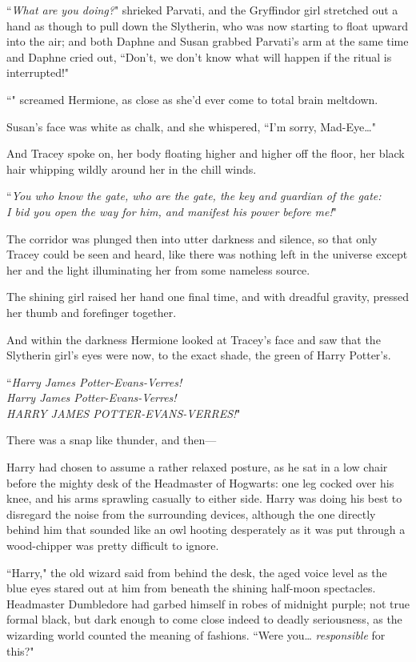 ``\emph{What are you doing?}" shrieked Parvati, and the Gryffindor girl stretched out a hand as though to pull down the Slytherin, who was now starting to float upward into the air; and both Daphne and Susan grabbed Parvati's arm at the same time and Daphne cried out, ``Don't, we don't know what will happen if the ritual is interrupted!"

``" screamed Hermione, as close as she'd ever come to total brain meltdown.

Susan's face was white as chalk, and she whispered, ``I'm sorry, Mad-Eye{\ldots}"

And Tracey spoke on, her body floating higher and higher off the floor, her black hair whipping wildly around her in the chill winds.

``\emph{You who know the gate, who are the gate, the key and guardian of the gate:\\
I bid you open the way for him, and manifest his power before me!}"

The corridor was plunged then into utter darkness and silence, so that only Tracey could be seen and heard, like there was nothing left in the universe except her and the light illuminating her from some nameless source.

The shining girl raised her hand one final time, and with dreadful gravity, pressed her thumb and forefinger together.

And within the darkness Hermione looked at Tracey's face and saw that the Slytherin girl's eyes were now, to the exact shade, the green of Harry Potter's.

``\emph{Harry James Potter-Evans-Verres!\\
Harry James Potter-Evans-Verres!\\
HARRY JAMES POTTER-EVANS-VERRES!}"

There was a snap like thunder, and then—

\later

Harry had chosen to assume a rather relaxed posture, as he sat in a low chair before the mighty desk of the Headmaster of Hogwarts: one leg cocked over his knee, and his arms sprawling casually to either side. Harry was doing his best to disregard the noise from the surrounding devices, although the one directly behind him that sounded like an owl hooting desperately as it was put through a wood-chipper was pretty difficult to ignore.

``Harry," the old wizard said from behind the desk, the aged voice level as the blue eyes stared out at him from beneath the shining half-moon spectacles. Headmaster Dumbledore had garbed himself in robes of midnight purple; not true formal black, but dark enough to come close indeed to deadly seriousness, as the wizarding world counted the meaning of fashions. ``Were you{\ldots} \emph{responsible} for this?"


